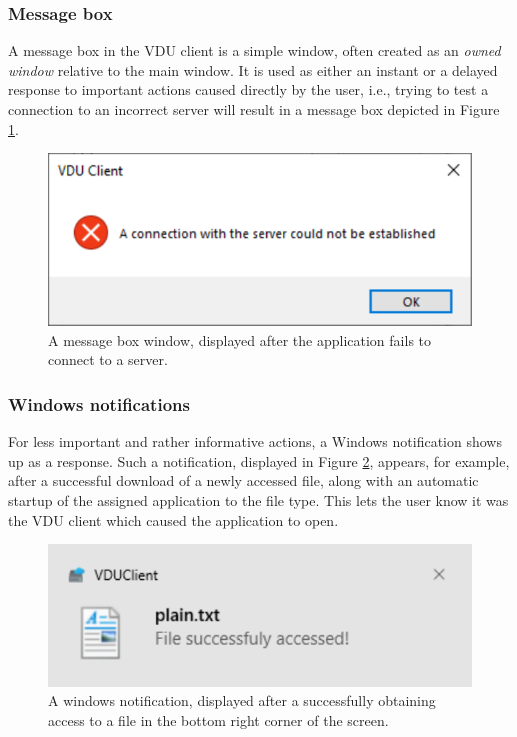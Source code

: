 \subsubsection{Message box}
A message box in the VDU client is a simple window, often created as an \textit{owned window} relative to the main window. It is used as either an instant or a delayed response to important actions caused directly by the user, i.e., trying to test a connection to an incorrect server will result in a message box depicted in Figure \ref{messageboxex}. 

\begin{figure}[H]
    \centering
	\includegraphics[]{obrazky-figures/messageboxex.pdf}
	\caption{A message box window, displayed after the application fails to connect to a server.}
	\label{messageboxex}
\end{figure}

\subsubsection{Windows notifications}
For less important and rather informative actions, a Windows notification shows up as a response. Such a notification, displayed in Figure \ref{notificationex}, appears, for example, after a successful download of a newly accessed file, along with an automatic startup of the assigned application to the file type. This lets the user know it was the VDU client which caused the application to open.
\begin{figure}[htb]
    \centering
	\includegraphics[]{obrazky-figures/notificationex.pdf}
	\caption{A windows notification, displayed after a successfully obtaining access to a file in the bottom right corner of the screen.}
	\label{notificationex}
\end{figure}


